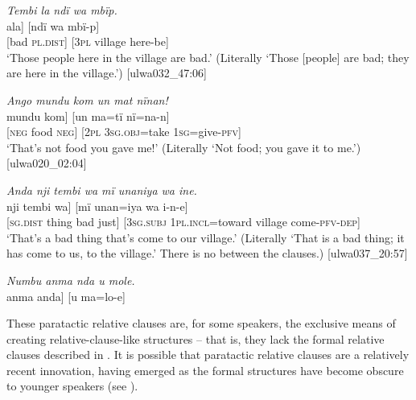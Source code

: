 \ea%
    \label{ex:complex:100}
          \textit{Tembi la ndï wa mbïp.}\\
\gll    {[tembi}  {ala]}    {[ndï}  wa    {mbï-p]}\\
    {[bad}  \textsc{pl.dist]}  \textsc{[3pl}  village  here-be]\\
\glt `Those people here in the village are bad.’ (Literally ‘Those [people] are bad; they are here in the village.’) [ulwa032\_47:06]
\z

\ea%
    \label{ex:complex:102}
          \textit{Ango mundu kom un mat nïnan!}\\
\gll    {[ango}  mundu  {kom]}  {[un}    ma=tï      {nï=na-n]}\\
    {[\textsc{neg}}  food  \textsc{neg]}  \textsc{[2pl}  \textsc{3sg.obj}=take  \textsc{1sg}=give-\textsc{pfv]}\\
\glt `That’s not food you gave me!’ (Literally ‘Not food; you gave it to me.’) [ulwa020\_02:04]
\z

\ea%
    \label{ex:complex:101}
          \textit{Anda nji tembi wa mï unaniya wa ine.}\\
\gll    {[anda}    nji    tembi  {wa]}  {[mï}      unan=iya wa    {i-n-e]}\\
    {[\textsc{sg.dist}}  thing  bad    {just]}  [3\textsc{sg.subj}  1\textsc{pl.incl}=toward    village  come-\textsc{pfv-dep]}\\
\glt `That’s a bad thing that’s come to our village.’ (Literally ‘That is a bad thing; it has come to us, to the village.’ There is no  between the clauses.) [ulwa037\_20:57]
\z

\ea%
    \label{ex:complex:103}
        \textit{Numbu anma nda u mole.}\\
\gll    {[numbu}  anma  {anda]}    {[u}    {ma=lo-e]}\\
    [garamut  good  \textsc{sg.dist]}  \textsc{[2sg}  \textsc{3sg.obj}=cut-\textsc{ipfv]}\\
\glt `That’s a good \textit{garamut} drum that you’re carving.’ (Literally ‘That is a good \textit{garamut}; you are carving it.’) [ulwa009\_02:08]
\z

These paratactic relative clauses are, for some speakers, the exclusive means of creating relative-clause-like structures -- that is, they lack the formal relative clauses described in . It is possible that paratactic relative clauses are a relatively recent  innovation, having emerged as the formal  structures have become obscure to younger speakers (see ).

